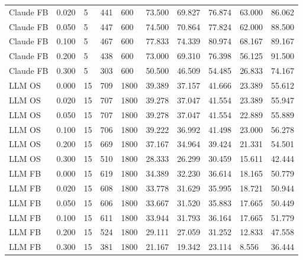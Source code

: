 \begin{tabular}{llllllllll}
Claude FB & 0.020 & 5 & 441 & 600 & 73.500 & 69.827 & 76.874 & 63.000 & 86.062 \\
Claude FB & 0.050 & 5 & 447 & 600 & 74.500 & 70.864 & 77.824 & 62.000 & 88.500 \\
Claude FB & 0.100 & 5 & 467 & 600 & 77.833 & 74.339 & 80.974 & 68.167 & 89.167 \\
Claude FB & 0.200 & 5 & 438 & 600 & 73.000 & 69.310 & 76.398 & 56.125 & 91.500 \\
Claude FB & 0.300 & 5 & 303 & 600 & 50.500 & 46.509 & 54.485 & 26.833 & 74.167 \\
LLM OS & 0.000 & 15 & 709 & 1800 & 39.389 & 37.157 & 41.666 & 23.389 & 55.612 \\
LLM OS & 0.020 & 15 & 707 & 1800 & 39.278 & 37.047 & 41.554 & 23.389 & 55.947 \\
LLM OS & 0.050 & 15 & 707 & 1800 & 39.278 & 37.047 & 41.554 & 22.889 & 55.889 \\
LLM OS & 0.100 & 15 & 706 & 1800 & 39.222 & 36.992 & 41.498 & 23.000 & 56.278 \\
LLM OS & 0.200 & 15 & 669 & 1800 & 37.167 & 34.964 & 39.424 & 21.331 & 54.501 \\
LLM OS & 0.300 & 15 & 510 & 1800 & 28.333 & 26.299 & 30.459 & 15.611 & 42.444 \\
LLM FB & 0.000 & 15 & 619 & 1800 & 34.389 & 32.230 & 36.614 & 18.165 & 50.779 \\
LLM FB & 0.020 & 15 & 608 & 1800 & 33.778 & 31.629 & 35.995 & 18.721 & 50.944 \\
LLM FB & 0.050 & 15 & 606 & 1800 & 33.667 & 31.520 & 35.883 & 17.665 & 50.449 \\
LLM FB & 0.100 & 15 & 611 & 1800 & 33.944 & 31.793 & 36.164 & 17.665 & 51.779 \\
LLM FB & 0.200 & 15 & 524 & 1800 & 29.111 & 27.059 & 31.252 & 12.833 & 47.558 \\
LLM FB & 0.300 & 15 & 381 & 1800 & 21.167 & 19.342 & 23.114 & 8.556 & 36.444 \\
\hline
\end{tabular}
